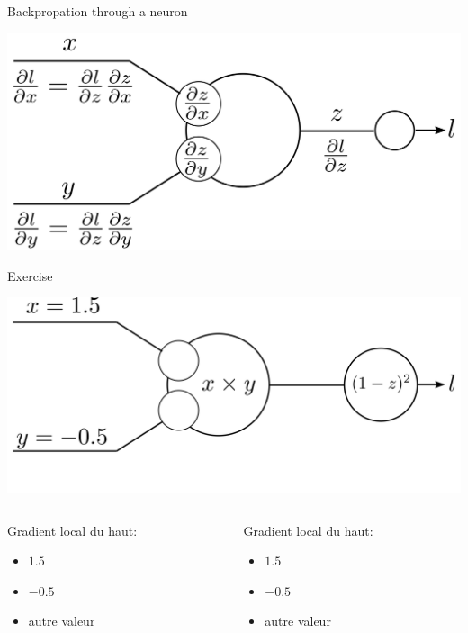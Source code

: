 \documentclass[xcolor=pdftex,dvipsnames,table,mathserif]{beamer}
\begin{document}
\begin{frame}{Backpropation through a neuron}

  \includegraphics[width=\textwidth]{bp_2_1_neuron.png}

\end{frame}


\begin{frame}{Exercise}

  \includegraphics[width=\textwidth]{bp_2_1_neuron_exo.png}

  \begin{columns}
    \begin{column}{.5\textwidth}
      Gradient local du haut:
      \begin{itemize}
      \item $1.5$
      \item $-0.5$
        \item autre valeur
      \end{itemize}
    \end{column}

    \begin{column}{.5\textwidth}
      Gradient local du haut:
      \begin{itemize}
      \item $1.5$
      \item $-0.5$
        \item autre valeur
      \end{itemize}

    \end{column}
  \end{columns}

\end{frame}
\end{document}
